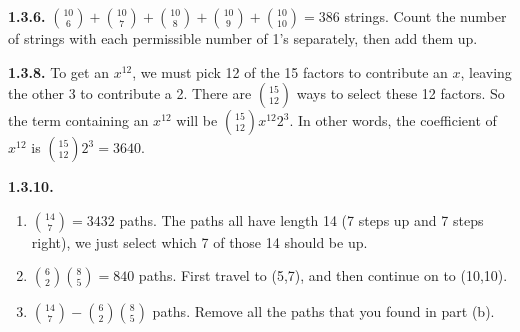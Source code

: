 \documentclass[10pt,]{book}
\theoremstyle{plain}
\theoremstyle{definition}
\theoremstyle{definition}
\theoremstyle{definition}
\theoremstyle{definition}
\numberwithin{equation}{chapter}
\begin{document}
%
\par\smallskip
\noindent\textbf{1.3.6.} \hypertarget{p-864}{}%
\({10 \choose 6} + {10\choose 7} + {10\choose 8} + {10 \choose 9} + {10\choose 10} = 386\) strings.  Count the number of strings with each permissible number of 1's separately, then add them up.%
\par\smallskip
\noindent\textbf{1.3.8.} \hypertarget{p-868}{}%
To get an \(x^{12}\), we must pick 12 of the 15 factors to contribute an \(x\), leaving the other 3 to contribute a 2. There are \({15 \choose 12}\) ways to select these 12 factors. So the term containing an \(x^{12}\) will be \({15 \choose 12}x^{12}2^{3}\). In other words, the coefficient of \(x^{12}\) is \({15\choose 12}2^3 = 3640\).%
\par\smallskip
\noindent\textbf{1.3.10.} \hypertarget{p-874}{}%
\leavevmode%
\begin{enumerate}[label=(\alph*)]
\item\hypertarget{li-411}{}\({14 \choose 7} = 3432\) paths.  The paths all have length 14 (7 steps up and 7 steps right), we just select which 7 of those 14 should be up.%
\item\hypertarget{li-412}{}\({6 \choose 2}{8\choose 5} = 840\) paths.  First travel to (5,7), and then continue on to (10,10).%
\item\hypertarget{li-413}{}\({14 \choose 7} - {6\choose 2}{8 \choose 5}\) paths.  Remove all the paths that you found in part (b).%
\end{enumerate}
%
\par\smallskip
\end{document}
